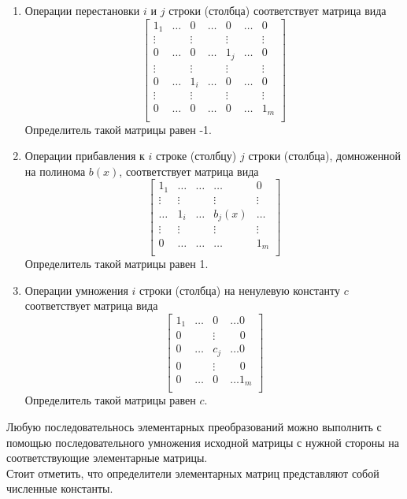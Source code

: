 \documentclass[14pt, a4paper]{extreport}
\begin{document}
		\begin{enumerate}
			\item Операции перестановки $i$ и $j$ строки (столбца) соответствует матрица вида
				\[
					\begin{bmatrix}
						1_1 & \dots & 0 & \dots & 0 & \dots & 0 \\
						\vdots & & \vdots & & \vdots & & \vdots \\
						0 & \dots & 0 & \dots & 1_j & \dots & 0 \\
						\vdots & & \vdots & & \vdots & & \vdots \\
						0 & \dots & 1_i & \dots & 0 & \dots & 0 \\
						\vdots & & \vdots & & \vdots & & \vdots \\
						0 & \dots & 0 & \dots & 0 & \dots & 1_m \\
					\end{bmatrix}
				\]
				Определитель такой матрицы равен -1.
			\item Операции прибавления к $i$ строке (столбцу) $j$ строки (столбца), домноженной на  полинома $b(x)$,
				соответствует матрица вида
				\[
					\begin{bmatrix}
						1_1   & \dots  & \dots & \dots    & 0 \\
						\vdots & \vdots &       & \vdots  & \vdots \\
						\dots & 1_i    & \dots & b_j(x) & \dots \\
						\vdots & \vdots &       & \vdots  & \vdots \\
						0     & \dots  & \dots & \dots    & 1_m \\
					\end{bmatrix}
				\]
				Определитель такой матрицы равен 1.
			\item Операции умножения $i$ строки (столбца) на ненулевую константу $c$ соответствует матрица вида
				\[
					\begin{bmatrix}
						1_1 & \dots & 0      & \dots 0 \\
						0   &       & \vdots & ~~~~     0 \\
						0   & \dots & c_j    & \dots 0 \\
						0   &       & \vdots & ~~~~     0 \\
						0   & \dots & 0      & \dots 1_m \\
					\end{bmatrix}
				\]
				Определитель такой матрицы равен $c$.
		\end{enumerate}
		Любую последовательнось элементарных преобразований можно
		выполнить с помощью последовательного умножения исходной матрицы с нужной
		стороны на соответствующие элементарные матрицы.\\
		Стоит отметить, что определители элементарных матриц представляют собой численные константы.
\end{document}
